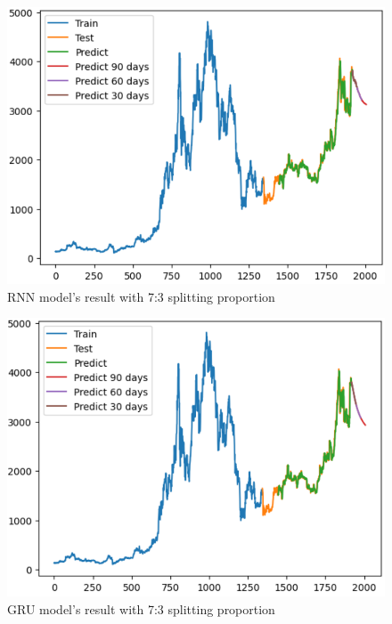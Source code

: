 \documentclass{ieeeojies}
\begin{document}
\begin{figure}[H]
	\centering
	\begin{minipage}{0.8\linewidth}
		\centering
		\includegraphics[width=\linewidth]{bibliography/Images/RNN_ETH_73.PNG}
		\caption{RNN model's result with 7:3 splitting proportion}
	\end{minipage}
\end{figure}
\begin{figure}[H]
	\centering
	\begin{minipage}{0.8\linewidth}
		\centering
		\includegraphics[width=\linewidth]{bibliography/Images/GRU_ETH_73.PNG}
		\caption{GRU model's result with 7:3 splitting proportion}
	\end{minipage}
\end{figure}
\end{document}
